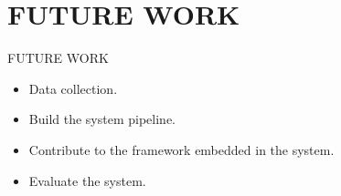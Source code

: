 \section{FUTURE WORK}
\begin{frame}{FUTURE WORK}
  \begin{itemize}
    \item Data collection.
    \item Build the system pipeline.
    \item Contribute to the framework embedded in the system.
    \item Evaluate the system.
  \end{itemize}
\end{frame}